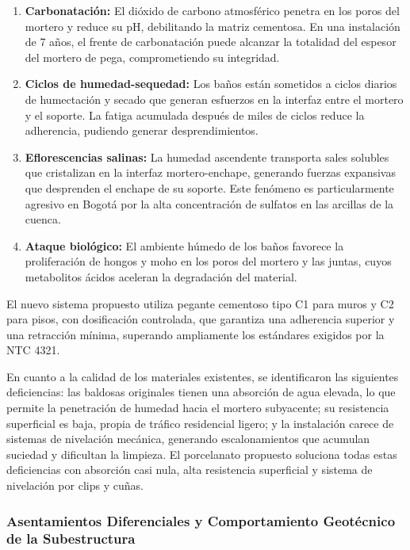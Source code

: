 ﻿\documentclass[12pt]{article}
\begin{document}
\begin{enumerate}[noitemsep]
  \item {\bfseries Carbonatación:} El dióxido de carbono atmosférico penetra en los
  poros del mortero y reduce su pH, debilitando la matriz cementosa. En una instalación
  de 7 años, el frente de carbonatación puede alcanzar la totalidad del espesor del
  mortero de pega, comprometiendo su integridad.
  \item {\bfseries Ciclos de humedad-sequedad:} Los baños están sometidos a ciclos
  diarios de humectación y secado que generan esfuerzos en la interfaz entre el mortero
  y el soporte. La fatiga acumulada después de miles de ciclos reduce la adherencia,
  pudiendo generar desprendimientos.
  \item {\bfseries Eflorescencias salinas:} La humedad ascendente transporta sales
  solubles que cristalizan en la interfaz mortero-enchape, generando fuerzas expansivas
  que desprenden el enchape de su soporte. Este fenómeno es particularmente agresivo
  en Bogotá por la alta concentración de sulfatos en las arcillas de la cuenca.
  \item {\bfseries Ataque biológico:} El ambiente húmedo de los baños favorece la
  proliferación de hongos y moho en los poros del mortero y las juntas, cuyos
  metabolitos ácidos aceleran la degradación del material.
\end{enumerate}

El nuevo sistema propuesto utiliza pegante cementoso tipo C1 para muros y C2 para pisos,
con dosificación controlada, que garantiza una adherencia superior y una retracción
mínima, superando ampliamente los estándares exigidos por la NTC 4321.

En cuanto a la calidad de los materiales existentes, se identificaron las siguientes
deficiencias: las baldosas originales tienen una absorción de agua elevada, lo que
permite la penetración de humedad hacia el mortero subyacente; su resistencia
superficial es baja, propia de tráfico residencial ligero; y la instalación carece de
sistemas de nivelación mecánica, generando escalonamientos que acumulan suciedad y
dificultan la limpieza. El porcelanato propuesto soluciona todas estas deficiencias
con absorción casi nula, alta resistencia superficial y sistema de nivelación por
clips y cuñas.

\subsubsection{Asentamientos Diferenciales y Comportamiento Geotécnico de la Subestructura}
\end{document}
